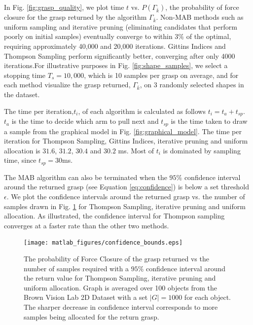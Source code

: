 \documentclass[10pt, conference]{ieeeconf}      %
\begin{document}
In Fig. \ref{fig:grasp_quality}, we plot time $t$ vs. $P(\Gamma_{\bar{k}})$, the probability of force closure for the grasp returned by the algorithm $\Gamma_{\bar{k}}$.  Non-MAB methods such as uniform sampling and iterative pruning (eliminating candidates that perform poorly on initial samples) eventually converge to within 3$\%$ of the optimal, requiring approximately 40,000 and 20,000 iterations.  Gittins Indices and Thompson Sampling  perform significantly better, converging after only 4000 iterations.For illustrative purposes in Fig. \ref{fig:shape_samples}, we select a stopping time $T_s=10,000$, which is 10 samples per grasp on average, and for each method visualize the grasp  returned, $\Gamma_{\bar{k}}$, on 3 randomly selected shapes in the dataset.

The time per iteration,$t_{i}$, of each algorithm is calculated as follows $t_{i} = t_{a}+t_{sp}$. $t_{a}$ is the time to decide which arm to pull next and $t_{sp}$ is the time taken to draw a sample from the graphical model in Fig. \ref{fig:graphical_model}. The time per iteration for Thompson Sampling, Gittins Indices, iterative pruning and uniform allocation is $31.6$, $31.2$, $30.4$ and $30.2$ ms. Most of $t_{i}$ is dominated by sampling time, since $t_{sp} = 30$ms.

The MAB algorithm can also be terminated when the $95\%$ confidence interval around the returned grasp (see Equation \ref{eq:confidence}) is below a set threshold $\epsilon$. We plot the confidence intervals around the returned grasp vs. the number of samples drawn in Fig. \ref{fig:confidence} for Thompson Sampling, iterative pruning\cite{kehoe2012toward} and uniform allocation.  As illustrated, the confidence interval for Thompson sampling converges at a faster rate than the other two methods. 


\begin{figure}[t!]
\centering
\texttt{[image: matlab\_figures/confidence\_bounds.eps]}
\caption{ The probability of Force Closure of the grasp returned vs the number of samples required with a $95\%$ confidence interval around the return value for Thompson Sampling, iterative pruning and uniform allocation. Graph is averaged over 100 objects from the Brown Vision Lab 2D Dataset \cite{brown} with a set $|G|=1000$ for each object. The sharper decrease in confidence interval corresponds to more samples being allocated for the return grasp. }

\vspace*{-10pt}
\label{fig:confidence}
\end{figure}
\end{document}
